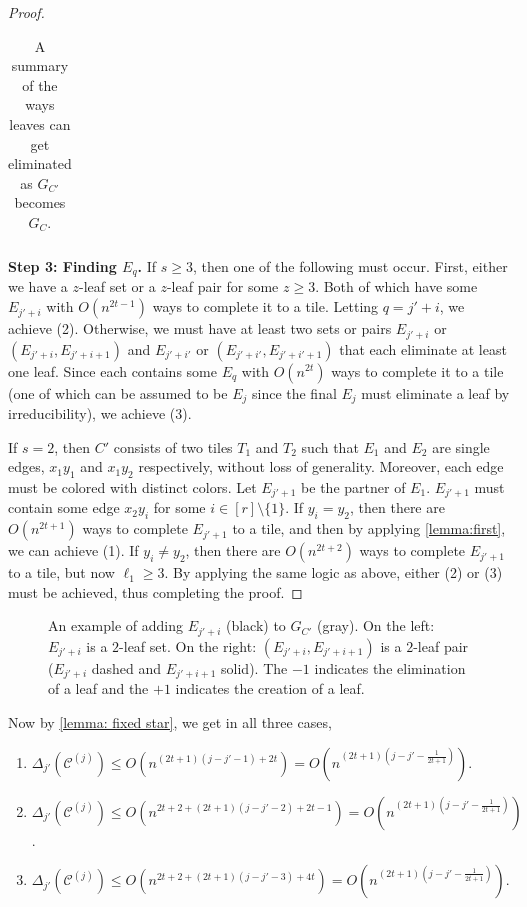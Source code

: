 \documentclass{article}
\theoremstyle{definition}
\begin{document}
\begin{proof}
\begin{table}[h!]
\begin{tabular}{|c|c|c|}
    \end{tabular}
    \caption{A summary of the ways leaves can get eliminated as $G_{C'}$ becomes $G_{C}$.}
    \label{tab:leaf}
\end{table}

\noindent\textbf{Step 3: Finding $E_q$.} If $s \geq 3$, then one of the following must occur. First, either we have a $z$-leaf set or a $z$-leaf pair for some $z\geq 3$. Both of which have some $E_{j'+i}$ with $O(n^{2t-1})$ ways to complete it to a tile. Letting $q=j'+i$, we achieve (2). Otherwise, we must have at least two sets or pairs $E_{j'+i}$ or $(E_{j'+i},E_{j'+i+1})$ and $E_{j'+i'}$ or $(E_{j'+i'},E_{j'+i'+1})$ that each eliminate at least one leaf. Since each contains some $E_q$ with $O(n^{2t})$ ways to complete it to a tile (one of which can be assumed to be $E_{j}$ since the final $E_j$ must eliminate a leaf by irreducibility), we achieve (3).  

If $s = 2$, then $C'$ consists of two tiles $T_1$ and $T_2$ such that $E_1$ and $E_2$ are single edges, $x_1y_1$ and $x_1y_2$ respectively, without loss of generality. Moreover, each edge must be colored with distinct colors. Let $E_{j'+1}$ be the partner of $E_1$. $E_{j'+1}$ must contain some edge $x_2y_i$ for some $i\in [r]\setminus \{1\}$. If $y_i = y_2$, then there are $O(n^{2t+1})$ ways to complete $E_{j'+1}$ to a tile, and then by applying \cref{lemma:first}, we can achieve (1). If $y_i \neq y_2$, then there are $O(n^{2t+2})$ ways to complete $E_{j'+1}$ to a tile, but now $\ell_1 \geq 3$. By applying the same logic as above, either (2) or (3) must be achieved, thus completing the proof.
\end{proof}

\begin{figure}[h!]
    \centering
    
    \caption{An example of adding $E_{j'+i}$ (black) to $G_{C'}$ (gray). On the left: $E_{j'+i}$ is a $2$-leaf set. On the right: $(E_{j'+i},E_{j'+i+1})$ is a $2$-leaf pair ($E_{j'+i}$ dashed and $E_{j'+i+1}$ solid). The $-1$ indicates the elimination of a leaf and the $+1$ indicates the creation of a leaf.}
    \label{fig:leaf-combos}
\end{figure}

Now by \cref{lemma: fixed star}, we get in all three cases,
\begin{enumerate}
    \item[(1)] $\Delta_{j'}(\mathcal{C}^{(j)})\leq O(n^{(2t+1)(j-j'-1)+2t}) = O\left(n^{(2t+1)(j-j'-\frac{1}{2t+1})}\right)$.
    \item[(2)] $\Delta_{j'}(\mathcal{C}^{(j)})\leq O(n^{2t+2+(2t+1)(j-j'-2)+2t-1})=O\left(n^{(2t+1)(j-j'-\frac{1}{2t+1})}\right)$.
    \item[(3)] $\Delta_{j'}(\mathcal{C}^{(j)})\leq O(n^{2t+2+(2t+1)(j-j'-3)+4t})=O\left(n^{(2t+1)(j-j'-\frac{1}{2t+1})}\right)$.
\end{enumerate}
\end{document}
